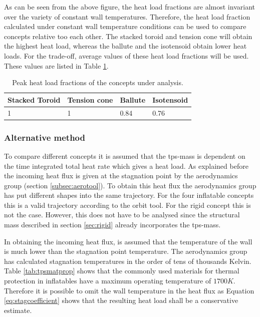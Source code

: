 As can be seen from the above figure, the heat load fractions are almost invariant over the variety of constant wall temperatures. Therefore, the heat load fraction calculated under constant wall temperature conditions can be used to compare concepts relative too each other. The stacked toroid and tension cone will obtain the highest heat load, whereas the ballute and the isotensoid obtain lower heat loads. For the trade-off, average values of these heat load fractions will be used. These values are listed in Table \ref{tab:fractions}.

\begin{table}[H]
	\centering
	\caption {Peak heat load fractions of the concepts under analysis.}
	\begin{tabular}{|l|l|l|l|}
		\hline
		Stacked Toroid & Tension cone & Ballute & Isotensoid \\ \hline
		1              & 1            & 0.84    & 0.76       \\ \hline
	\end{tabular}
	\label{tab:fractions}
\end{table}

\subsubsection{Alternative method}
To compare different concepts it is assumed that the \gls{tps}-mass is dependent on the time integrated total heat rate which gives a heat load. As explained before the incoming heat flux is given at the stagnation point by the aerodynamics group (section \ref{subsec:aerotool}). To obtain this heat flux the aerodynamics group has put different shapes into the same trajectory. For the four inflatable concepts this is a valid trajectory according to the orbit tool. For the rigid concept this is not the case. However, this does not have to be analysed since the structural mass described in section \ref{sec:rigid} already incorporates the \gls{tps}-mass.

In obtaining the incoming heat flux, is assumed that the temperature of the wall is much lower than the stagnation point temperature. The aerodynamics group has calculated stagnation temperatures in the order of tens of thousands Kelvin. Table \ref{tab:tpsmatprop} shows that the commonly used materials for thermal protection in inflatables have a maximum operating temperature of $1700K$. Therefore it is possible to omit the wall temperature in the heat flux as Equation \eqref{eq:stagcoefficient} shows that the resulting heat load shall be a conservative estimate. 


